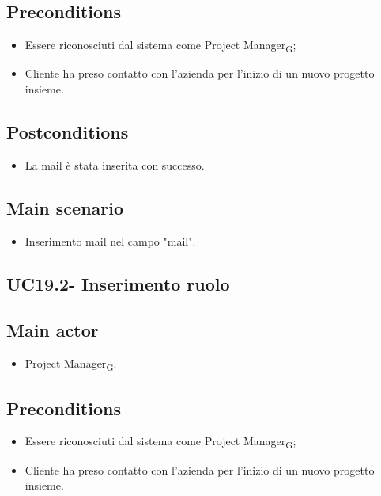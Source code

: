 \documentclass{article}
\begin{document}
    \subsection*{Preconditions}
        \begin{itemize}
            \item Essere riconosciuti dal sistema come Project Manager\textsubscript{G};
            \item Cliente ha preso contatto con l'azienda per l'inizio di un nuovo progetto insieme.
        \end{itemize}
    
    \subsection*{Postconditions}
        \begin{itemize}
            \item La mail è stata inserita con successo.
        \end{itemize}

    \subsection*{Main scenario}
        \begin{itemize}
            \item Inserimento mail nel campo "mail".
        \end{itemize}
        

    \subsection{UC19.2- Inserimento ruolo}
    \subsection*{Main actor}
        \begin{itemize}
            \item Project Manager\textsubscript{G}.
        \end{itemize}
        
    \subsection*{Preconditions}
        \begin{itemize}
            \item Essere riconosciuti dal sistema come Project Manager\textsubscript{G};
            \item Cliente ha preso contatto con l'azienda per l'inizio di un nuovo progetto insieme.
        \end{itemize}
        
\end{document}
